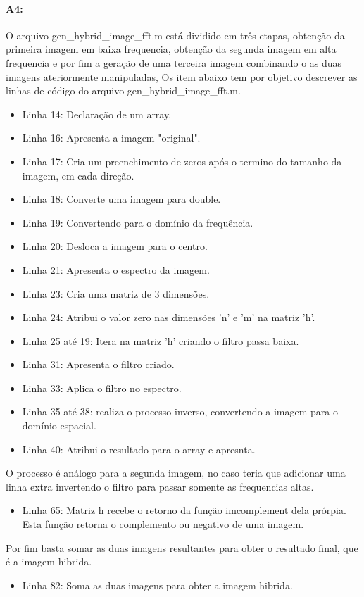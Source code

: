 \paragraph{A4:} O arquivo gen\_hybrid\_image\_fft.m está dividido em três etapas, obtenção da primeira imagem em baixa frequencia, obtenção da segunda imagem em alta frequencia e por fim a geração de uma terceira imagem combinando o as duas imagens ateriormente manipuladas, Os item abaixo tem por objetivo descrever as linhas de código do arquivo gen\_hybrid\_image\_fft.m.
\begin{itemize}
\item Linha 14: Declaração de um array.
\item Linha 16: Apresenta a imagem "original".
\item Linha 17: Cria um preenchimento de zeros após o termino do tamanho da imagem, em cada direção.
\item Linha 18: Converte uma imagem para double.
\item Linha 19: Convertendo para o domínio da frequência.
\item Linha 20: Desloca a imagem para o centro.
\item Linha 21: Apresenta o espectro da imagem.
\item Linha 23: Cria uma matriz de 3 dimensões.
\item Linha 24: Atribui o valor zero nas dimensões 'n' e 'm' na matriz 'h'.
\item Linha 25 até 19: Itera na matriz 'h' criando o filtro passa baixa.
\item Linha 31: Apresenta o filtro criado.
\item Linha 33: Aplica o filtro no espectro.
\item Linha 35 até 38: realiza o processo inverso, convertendo a imagem para o domínio espacial.
\item Linha 40: Atribui o resultado para o array e apresnta.
\end{itemize}

O processo é análogo para a segunda imagem, no caso teria que adicionar uma linha extra invertendo o filtro para passar somente as frequencias altas.
\begin{itemize}
    \item Linha 65: Matriz h recebe o retorno da função imcomplement dela prórpia. Esta função retorna o complemento ou negativo de uma imagem.
\end{itemize}

Por fim basta somar as duas imagens resultantes para obter o resultado final, que é a imagem hibrida.
\begin{itemize}
    \item Linha 82: Soma as duas imagens para obter a imagem hibrida.
\end{itemize}

